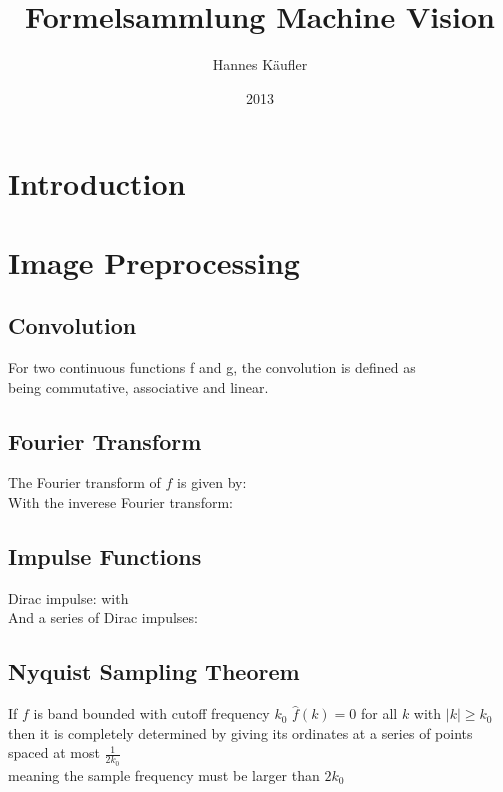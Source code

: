 \documentclass[a4paper,12pt,pdftex]{scrreprt}
\title{Formelsammlung Machine Vision}
\author{Hannes Käufler}
\date{2013}
\begin{document}
	\chapter{Introduction} %
	\label{cha:introduction}

	\chapter{Image Preprocessing} %
	\label{cha:image_preprocessing}
	
	\section{Convolution} %
	\label{sec:convolution}
	For two continuous functions f and g, the convolution is defined as\\
	being commutative, associative and linear. 

	\section{Fourier Transform} %
	\label{sec:fourier_transform}
	The Fourier transform of $f$ is given by:\\
	With the inverese Fourier transform:\\

	\section{Impulse Functions} %
	\label{sec:impulse_functions}
	Dirac impulse:
	with \\
	And a series of Dirac impulses:

	\section{Nyquist Sampling Theorem} %
	\label{sec:nyquist_sampling_theorem}
	If $f$ is band bounded with cutoff frequency $k_{0}$
	$\hat{f}(k)=0$ for all $k$ with $\lvert k \rvert \geq k_{0}$\\
	then it is completely determined by giving its ordinates at a series of points spaced at most
	$\frac{1}{2k_{0}}$\\ 
	meaning the sample frequency must be larger than $2k_{0}$
\end{document}

